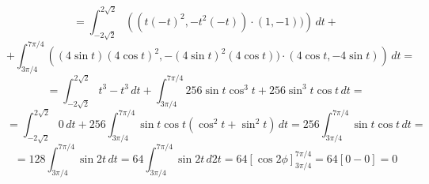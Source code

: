 \begin{center}
$$= \int_{-2\sqrt{2}}^{2\sqrt{2}} \left((t(-t)^2, - t^2(-t)) \cdot (1,-1)) \right)\, dt +$$ 
$$+\int_{3\pi/4}^{7\pi/4} \left((4\sin{t})(4\cos{t})^2, - (4\sin{t})^2(4\cos{t}))\cdot(4\cos{t}, -4\sin{t})\right)\,dt = $$
$$= \int_{-2\sqrt{2}}^{2\sqrt{2}} t^3 - t^3\, dt + \int_{3\pi/4}^{7\pi/4} 256\sin{t}\cos^3{t} + 256\sin^3{t}\cos{t}\,dt =$$
$$= \int_{-2\sqrt{2}}^{2\sqrt{2}} 0\, dt + 256\int_{3\pi/4}^{7\pi/4} \sin{t}\cos{t}(\cos^2{t} + \sin^2{t})\,dt =256\int_{3\pi/4}^{7\pi/4} \sin{t}\cos{t}\,dt =$$
$$= 128\int_{3\pi/4}^{7\pi/4} \sin{2t}\,dt = 64\int_{3\pi/4}^{7\pi/4} \sin{2t}\,d2t = 64\left[ \cos{2\phi} \right]_{3\pi/4}^{7\pi/4} = 64[0-0]= \boxed{0}$$
\end{center}

